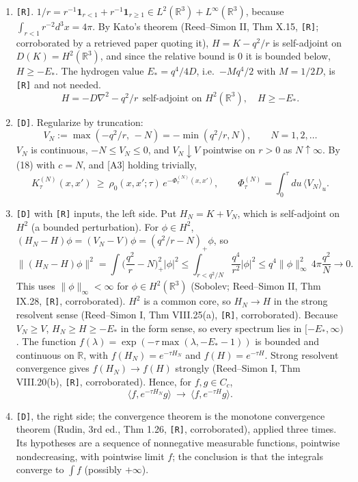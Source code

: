 \documentclass[11pt,a4paper]{article}
\providecommand{\tightlist}{\setlength{\itemsep}{0pt}\setlength{\parskip}{0pt}}
\begin{document}
\begin{enumerate}
\def\labelenumi{(\roman{enumi})}
\tightlist
\item
  \texttt{[R]}. \(1/r=r^{-1}\mathbf 1_{r<1}+r^{-1}\mathbf 1_{r\ge1}\in L^2(\mathbb R^3)+L^\infty(\mathbb R^3)\), because \(\int_{r<1}r^{-2}d^3x=4\pi\). By Kato's theorem (Reed--Simon II, Thm X.15, \texttt{[R]}; corroborated by a retrieved paper quoting it), \(H=K-q^2/r\) is self-adjoint on \(D(K)=H^2(\mathbb R^3)\), and since the relative bound is \(0\) it is bounded below, \(H\ge-E_*\). The hydrogen value \(E_*=q^4/4D\), i.e.~\(-Mq^4/2\) with \(M=1/2D\), is \texttt{[R]} and not needed.
  \[H=-D\nabla^2-q^2/r\ \ \text{self-adjoint on }H^2(\mathbb R^3),\quad H\ge-E_*.\tag{38}\]
\item
  \texttt{[D]}. Regularize by truncation:
  \[V_N:=\max(-q^2/r,\,-N)=-\min(q^2/r,N),\qquad N=1,2,\dots\tag{39}\]
  \(V_N\) is continuous, \(-N\le V_N\le0\), and \(V_N\downarrow V\) pointwise on \(r>0\) as \(N\uparrow\infty\). By (18) with \(c=N\), and {[}A3{]} holding trivially,
  \[K^{(N)}_\tau(x,x')\ \ge\ \rho_0(x,x';\tau)\,e^{-\Phi^{(N)}_\tau(x,x')},\qquad\Phi^{(N)}_\tau=\int_0^\tau du\,\langle V_N\rangle_u.\tag{40}\]
\item
  \texttt{[D]} with \texttt{[R]} inputs, the left side. Put \(H_N=K+V_N\), which is self-adjoint on \(H^2\) (a bounded perturbation). For \(\phi\in H^2\), \((H_N-H)\phi=(V_N-V)\phi=(q^2/r-N)_+\phi\), so
  \[\|(H_N-H)\phi\|^2=\int\Big(\frac{q^2}r-N\Big)_+^2|\phi|^2\le\int_{r<q^2/N}\frac{q^4}{r^2}|\phi|^2\le q^4\|\phi\|_\infty^2\,4\pi\frac{q^2}N\to0.\]
  This uses \(\|\phi\|_\infty<\infty\) for \(\phi\in H^2(\mathbb R^3)\) (Sobolev; Reed--Simon II, Thm IX.28, \texttt{[R]}, corroborated). \(H^2\) is a common core, so \(H_N\to H\) in the strong resolvent sense (Reed--Simon I, Thm VIII.25(a), \texttt{[R]}, corroborated). Because \(V_N\ge V\), \(H_N\ge H\ge-E_*\) in the form sense, so every spectrum lies in \([-E_*,\infty)\). The function \(f(\lambda)=\exp(-\tau\max(\lambda,-E_*-1))\) is bounded and continuous on \(\mathbb R\), with \(f(H_N)=e^{-\tau H_N}\) and \(f(H)=e^{-\tau H}\). Strong resolvent convergence gives \(f(H_N)\to f(H)\) strongly (Reed--Simon I, Thm VIII.20(b), \texttt{[R]}, corroborated). Hence, for \(f,g\in C_c\),
  \[\langle f,e^{-\tau H_N}g\rangle\ \longrightarrow\ \langle f,e^{-\tau H}g\rangle.\tag{41}\]
\item
  \texttt{[D]}, the right side; the convergence theorem is the monotone convergence theorem (Rudin, 3rd ed., Thm 1.26, \texttt{[R]}, corroborated), applied three times. Its hypotheses are a sequence of nonnegative measurable functions, pointwise nondecreasing, with pointwise limit \(f\); the conclusion is that the integrals converge to \(\int f\) (possibly \(+\infty\)).

\end{enumerate}
\end{document}

